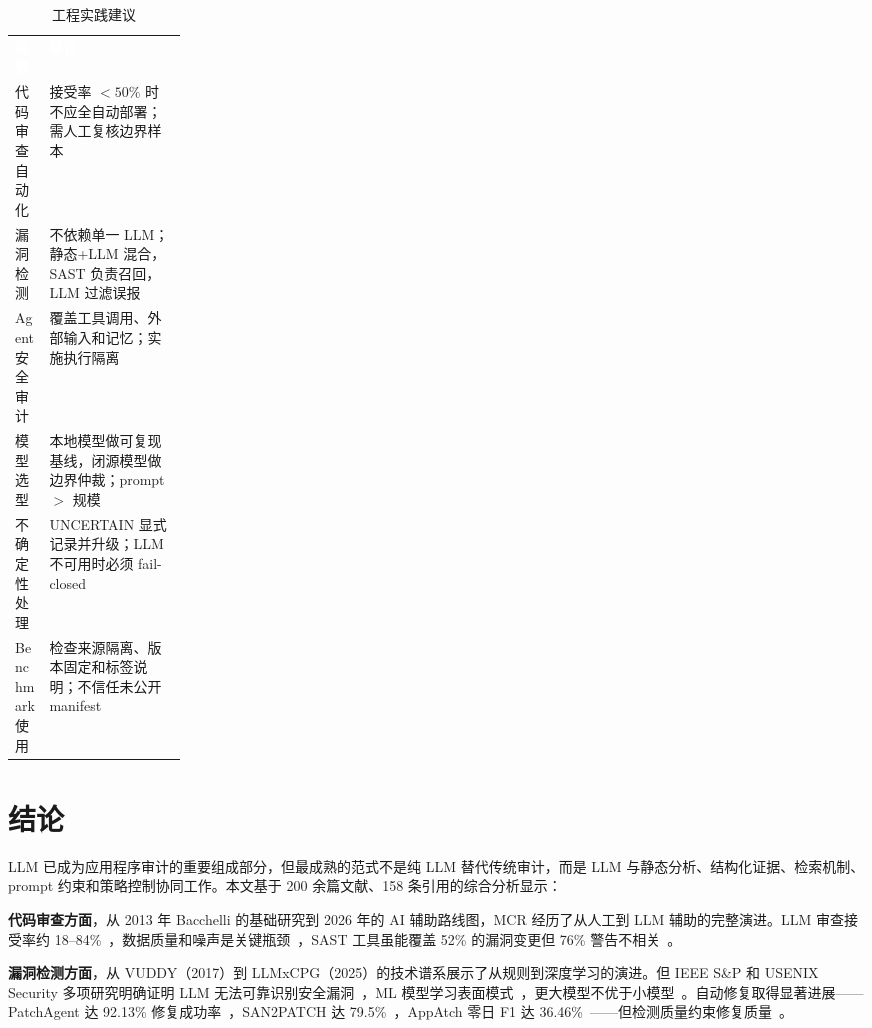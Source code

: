 \documentclass[11pt,a4paper,onecolumn]{article}
\newcommand{\tabheader}[1]{\textcolor{white}{\textbf{#1}}}
\begin{document}
\begin{table}[htbp]
\caption{工程实践建议}
\label{tab:practice_recommendations}
\centering
\small
\begin{tabularx}{\linewidth}{@{} p{0.20\linewidth}X @{}}
\rowcolor{tabhead}
\tabheader{场景} & \tabheader{建议} \\
\rowcolor{tabalt} 代码审查自动化 & 接受率 $<50\%$ 时不应全自动部署；需人工复核边界样本 \\
漏洞检测 & 不依赖单一 LLM；静态+LLM 混合，SAST 负责召回，LLM 过滤误报 \\
\rowcolor{tabalt} Agent 安全审计 & 覆盖工具调用、外部输入和记忆；实施执行隔离~\cite{wu2025isolateGpt} \\
模型选型 & 本地模型做可复现基线，闭源模型做边界仲裁；prompt $>$ 规模~\cite{niu2025largetomammoth} \\
\rowcolor{tabalt} 不确定性处理 & UNCERTAIN 显式记录并升级；LLM 不可用时必须 fail-closed \\
Benchmark 使用 & 检查来源隔离、版本固定和标签说明；不信任未公开 manifest \\
\end{tabularx}
\end{table}

\section{结论}
LLM 已成为应用程序审计的重要组成部分，但最成熟的范式不是纯 LLM 替代传统审计，而是 LLM 与静态分析、结构化证据、检索机制、prompt 约束和策略控制协同工作。本文基于 200 余篇文献、158 条引用的综合分析显示：

\textbf{代码审查方面}，从 2013 年 Bacchelli 的基础研究到 2026 年的 AI 辅助路线图，MCR 经历了从人工到 LLM 辅助的完整演进。LLM 审查接受率约 18--84\%~\cite{olewicki_2024_llm_review_impact,peng_2025_icodereviewer}，数据质量和噪声是关键瓶颈~\cite{liu_2025_noisy_data,tufano_2024_strengths_weaknesses}，SAST 工具虽能覆盖 52\% 的漏洞变更但 76\% 警告不相关~\cite{charoenwet_2024_sast_secure_review}。

\textbf{漏洞检测方面}，从 VUDDY（2017）到 LLMxCPG（2025）的技术谱系展示了从规则到深度学习的演进。但 IEEE S\&P 和 USENIX Security 多项研究明确证明 LLM 无法可靠识别安全漏洞~\cite{paquette2024llmscannot,ullaha_vuln_reasoning_2024}，ML 模型学习表面模式~\cite{risse2024limits}，更大模型不优于小模型~\cite{niu2025largetomammoth}。自动修复取得显著进展——PatchAgent 达 92.13\% 修复成功率~\cite{yu2025patchagent}，SAN2PATCH 达 79.5\%~\cite{kim2025san2patch}，AppAtch 零日 F1 达 36.46\%~\cite{wen2025appatch}——但检测质量约束修复质量~\cite{sok2025avr}。
\end{document}
